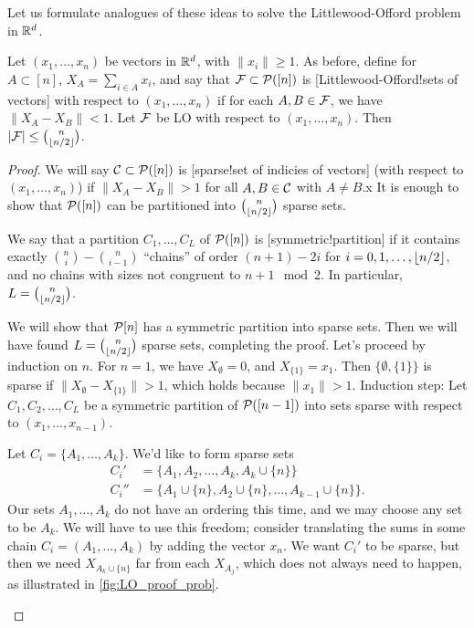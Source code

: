 Let us formulate analogues of these ideas to solve the Littlewood-Offord problem in $\R^d$.
\begin{theorem} \label{thm:kleit70}
Let $(x_1,\dotsc,x_n)$ be vectors in $\R^d$, with $\|x_i\| \geq 1$. As before, define for $A\subset [n]$, $X_A = \sum_{i\in A} x_i$, and say that $\F\subset \P([n])$ is [Littlewood-Offord!sets of vectors] with respect to $(x_1,\dotsc,x_n)$ if for each $A,B\in \F$, we have $\|X_A - X_B\| < 1$.
Let $\F$ be LO with respect to $(x_1,\dotsc,x_n)$. Then $|\F| \leq { n\choose \floor{n/2}}$.
\end{theorem}
\begin{proof}	
We will say $\Cset\subset \P([n])$ is [sparse!set of indicies of vectors] (with respect to $(x_1,\dotsc,x_n)$) if $\|X_A-X_B\| > 1$ for all $A,B\in \Cset$ with $A\neq B$.x
It is enough to show that $\P([n])$ can be partitioned into ${n\choose \floor{n/2}}$ sparse sets. 

We say that a partition $C_1,\dotsc,C_L$ of $\P([n])$ is [symmetric!partition] if it contains exactly ${n\choose i} - {n\choose i-1}$ ``chains'' of order $(n+1)-2i$ for $i=0,1,\dotsc,\floor{n/2}$, and no chains with sizes not congruent to $n+1 \mod 2$.   In particular, $L= {n\choose \floor{n/2}}$.

We will show that $\P[n]$ has a symmetric partition into sparse sets. Then we will have found $L = {n\choose \floor{n/2}}$ sparse sets, completing the proof.
Let's proceed by induction on $n$. For $n=1$, we have $X_\emptyset = 0$, and $X_{\{1\}} = x_1$. Then $\{\emptyset, \{1\}\}$ is sparse if $\|X_\emptyset - X_{\{1\}}\| > 1$, which holds because $\|x_1\| > 1$.
Induction step: Let $C_1,C_2,\dotsc, C_L$ be a symmetric partition of $\P([n-1])$ into sets sparse with respect to $(x_1,\dotsc,x_{n-1})$. 

Let $C_i = \{A_1,\dotsc,A_k\}$. We'd like to form sparse sets
\begin{align*}	
C_i' &= \{A_1,A_2,\dotsc,A_k,A_k \cup \{n\}\}\\
C_i'' &= \{A_1\cup \{n\}, A_2\cup\{n\},\dotsc,A_{k-1}\cup \{n\}\}.
\end{align*}
Our sets $A_1,\dotsc,A_k$ do not have an ordering this time, and we may choose any set to be $A_k$. We will have to use this freedom; consider translating the sums in some chain $C_i = (A_1,\dotsc,A_k)$ by adding the vector $x_n$. We want $C_i'$ to be sparse, but then we need $X_{A_k\cup\{n\}}$ far from each $X_{A_j}$, which does not always need to happen, as illustrated in \cref{fig:LO_proof_prob}.
\begin{marginfigure}[-3cm]



\end{marginfigure}
\end{proof}

